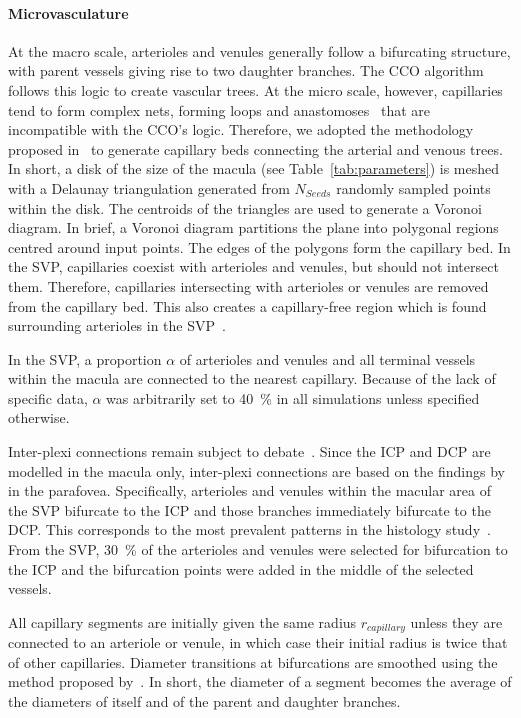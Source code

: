 \documentclass[11pt,]{article}
\begin{document}
\paragraph{Microvasculature}\label{sec:microvasculature} At the macro
scale, arterioles and venules generally follow a bifurcating
structure, with parent vessels giving rise to two daughter
branches. The CCO algorithm follows this logic to create vascular
trees.  At the micro scale, however, capillaries tend to form complex
nets, forming loops and anastomoses~\cite{An2020} that are
incompatible with the CCO’s logic.
Therefore, we adopted the methodology proposed in~\cite{Linninger2013} to generate capillary beds connecting
the arterial and venous trees.
In short, a disk of the size of the macula (see Table~\ref{tab:parameters}) is meshed with a Delaunay
triangulation generated from $N_{Seeds}$ randomly sampled points
within the disk.
The centroids of the triangles are used to generate a Voronoi diagram.
In brief, a Voronoi diagram partitions the plane into polygonal regions centred around input points. 
The edges of the polygons form the capillary bed.
In the SVP, capillaries coexist with arterioles and venules, but should not intersect them.
Therefore, capillaries intersecting with arterioles or venules are removed from the capillary bed.
This also creates a capillary-free region which is found surrounding arterioles in the SVP~\cite{An2020}.

In the SVP, a proportion $\alpha$ of arterioles and venules and all terminal vessels within the macula are connected to the nearest capillary. Because of the lack of specific data, $\alpha$ was arbitrarily set to \SI{40}{\percent} in all simulations unless specified otherwise.

Inter-plexi connections remain subject to debate~\cite{An2020,Chiaravalli2022,Campbell2017}.
Since the ICP and DCP are modelled in the macula only, inter-plexi connections are based on the findings by~\cite{An2020} in the parafovea.
Specifically, arterioles and venules within the macular area of the SVP bifurcate to the ICP and those branches immediately bifurcate to the DCP.
This corresponds to the most prevalent patterns in the histology study~\cite{An2020}.
From the SVP, \SI{30}{\percent} of the arterioles and venules were selected for bifurcation to the ICP and the bifurcation points were added in the middle of the selected vessels.

All capillary segments are initially given the same radius $r_{capillary}$ unless they are connected to an arteriole or venule, in which case their initial radius is twice that of other capillaries.
Diameter transitions at bifurcations are smoothed using the method proposed by~\cite{Linninger2013}.
In short, the diameter of a segment becomes the average of the diameters of itself and of the parent and daughter branches.
\end{document}
